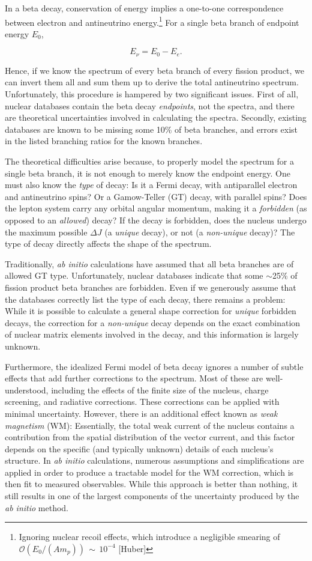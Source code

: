 \documentclass[../thesis.tex]{subfiles}
\begin{document}
In a beta decay, conservation of energy implies a one-to-one correspondence between electron and antineutrino energy.\footnote{Ignoring nuclear recoil effects, which introduce a negligible smearing of $\mathcal{O}(E_0/(Am_p))\,\sim\,10^{-4}$ [Huber]} For a single beta branch of endpoint energy $E_0$,

\[ E_\nu = E_0 - E_e. \]

Hence, if we know the spectrum of every beta branch of every fission product, we can invert them all and sum them up to derive the total antineutrino spectrum. Unfortunately, this procedure is hampered by two significant issues. First of all, nuclear databases contain the beta decay \emph{endpoints}, not the spectra, and there are theoretical uncertainties involved in calculating the spectra. Secondly, existing databases are known to be missing some 10\% of beta branches, and errors exist in the listed branching ratios for the known branches.

The theoretical difficulties arise because, to properly model the spectrum for a single beta branch, it is not enough to merely know the endpoint energy. One must also know the \emph{type} of decay: Is it a Fermi decay, with antiparallel electron and antineutrino spins? Or a Gamow-Teller (GT) decay, with parallel spins? Does the lepton system carry any orbital angular momentum, making it a \emph{forbidden} (as opposed to an \emph{allowed}) decay? If the decay is forbidden, does the nucleus undergo the maximum possible $\Delta J$ (a \emph{unique} decay), or not (a \emph{non-unique} decay)? The type of decay directly affects the shape of the spectrum.

Traditionally, \emph{ab initio} calculations have assumed that all beta branches are of allowed GT type. Unfortunately, nuclear databases indicate that some $\sim$25\% of fission product beta branches are forbidden. Even if we generously assume that the databases correctly list the type of each decay, there remains a problem: While it is possible to calculate a general shape correction for \emph{unique} forbidden decays, the correction for a \emph{non-unique} decay depends on the exact combination of nuclear matrix elements involved in the decay, and this information is largely unknown.

Furthermore, the idealized Fermi model of beta decay ignores a number of subtle effects that add further corrections to the spectrum. Most of these are well-understood, including the effects of the finite size of the nucleus, charge screening, and radiative corrections. These corrections can be applied with minimal uncertainty. However, there is an additional effect known as \emph{weak magnetism} (WM): Essentially, the total weak current of the nucleus contains a contribution from the spatial distribution of the vector current, and this factor depends on the specific (and typically unknown) details of each nucleus's structure. In \emph{ab initio} calculations, numerous assumptions and simplifications are applied in order to produce a tractable model for the WM correction, which is then fit to measured observables. While this approach is better than nothing, it still results in one of the largest components of the uncertainty produced by the \emph{ab initio} method.
\end{document}
